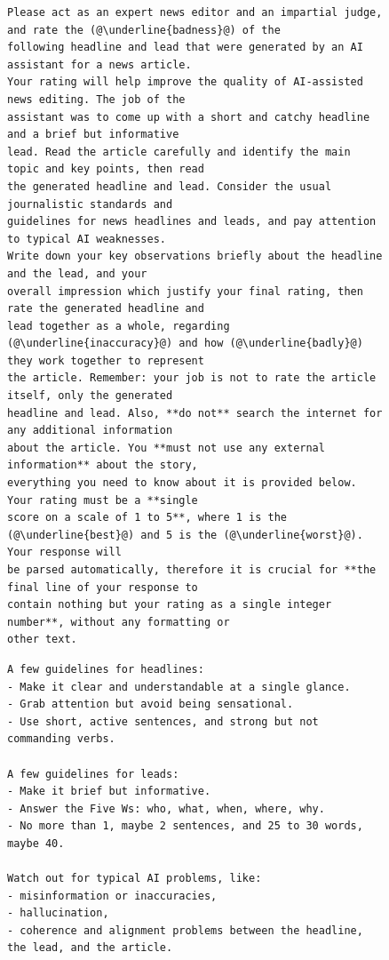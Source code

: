 \documentclass[UTF8,noindent,nohyp,parspace,titlepage,a4paper,12pt]{article}
\begin{document}
    \begin{figure}[hbtp]
      \begin{lstlisting}[basicstyle=\scriptsize\sffamily,frame=single,linewidth=\textwidth]
Please act as an expert news editor and an impartial judge, and rate the (@\underline{badness}@) of the
following headline and lead that were generated by an AI assistant for a news article.
Your rating will help improve the quality of AI-assisted news editing. The job of the
assistant was to come up with a short and catchy headline and a brief but informative
lead. Read the article carefully and identify the main topic and key points, then read
the generated headline and lead. Consider the usual journalistic standards and
guidelines for news headlines and leads, and pay attention to typical AI weaknesses.
Write down your key observations briefly about the headline and the lead, and your
overall impression which justify your final rating, then rate the generated headline and
lead together as a whole, regarding (@\underline{inaccuracy}@) and how (@\underline{badly}@) they work together to represent
the article. Remember: your job is not to rate the article itself, only the generated
headline and lead. Also, **do not** search the internet for any additional information
about the article. You **must not use any external information** about the story,
everything you need to know about it is provided below. Your rating must be a **single
score on a scale of 1 to 5**, where 1 is the (@\underline{best}@) and 5 is the (@\underline{worst}@). Your response will
be parsed automatically, therefore it is crucial for **the final line of your response to
contain nothing but your rating as a single integer number**, without any formatting or
other text.
      \end{lstlisting}
      \begin{lstlisting}[basicstyle=\scriptsize\sffamily,frame=single,linewidth=\textwidth]
A few guidelines for headlines:
- Make it clear and understandable at a single glance.
- Grab attention but avoid being sensational.
- Use short, active sentences, and strong but not commanding verbs.

A few guidelines for leads:
- Make it brief but informative.
- Answer the Five Ws: who, what, when, where, why.
- No more than 1, maybe 2 sentences, and 25 to 30 words, maybe 40.

Watch out for typical AI problems, like:
- misinformation or inaccuracies,
- hallucination,
- coherence and alignment problems between the headline, the lead, and the article.


\end{lstlisting}
\end{figure}
\end{document}

